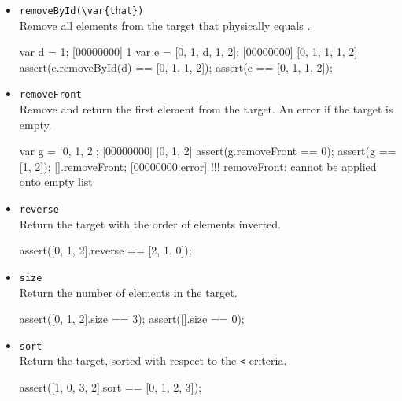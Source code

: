 \begin{itemize}
\begin{urbiscript}[firstnumber=last]
var t = [0, 1, 2];
[00000000] [0, 1, 2]
assert(t.removeBack == 2);
assert(t == [0, 1]);
[].removeBack;
[00000000:error] !!! removeBack: cannot be applied onto empty list
\end{urbiscript}

\item \lstinline|removeById(\var{that})|\\
Remove all elements from the target that physically equals .

\begin{urbiscript}[firstnumber=last]
var d = 1;
[00000000] 1
var e = [0, 1, d, 1, 2];
[00000000] [0, 1, 1, 1, 2]
assert(e.removeById(d) == [0, 1, 1, 2]);
assert(e == [0, 1, 1, 2]);
\end{urbiscript}

\item \lstinline|removeFront|\\
Remove and return the first element from the target. An error if the
target is empty.

\begin{urbiscript}[firstnumber=last]
var g = [0, 1, 2];
[00000000] [0, 1, 2]
assert(g.removeFront == 0);
assert(g == [1, 2]);
[].removeFront;
[00000000:error] !!! removeFront: cannot be applied onto empty list
\end{urbiscript}

\item \lstinline|reverse|\\
Return the target with the order of elements inverted.

\begin{urbiscript}[firstnumber=last]
assert([0, 1, 2].reverse == [2, 1, 0]);
\end{urbiscript}

\item \lstinline|size|\\
Return the number of elements in the target.

\begin{urbiscript}[firstnumber=last]
assert([0, 1, 2].size == 3);
assert([].size == 0);
\end{urbiscript}

\item \lstinline|sort|\\
Return the target, sorted with respect to the \lstinline|<| criteria.

\begin{urbiscript}[firstnumber=last]
assert([1, 0, 3, 2].sort == [0, 1, 2, 3]);
\end{urbiscript}


\end{itemize}
